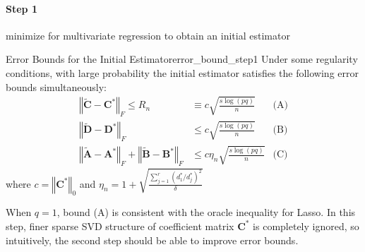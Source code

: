 \documentclass[twoside]{article}
\begin{document}
\paragraph*{Step 1} minimize  for multivariate regression to obtain an initial estimator
\begin{theorem}{Error Bounds for the Initial Estimator}{error_bound_step1}
    Under some regularity conditions, with large probability the initial estimator satisfies the following error bounds simultaneously:
    \begin{align*}
        \left\Vert \tilde{\mathbf{C}}-\mathbf{C}^* \right\Vert _F\leq R_n &\equiv c\sqrt{\frac{s \log (pq)}{n}} & \text{(A)}\\
        \left\Vert \tilde{\mathbf{D}}-\mathbf{D}^* \right\Vert _F &\leq c\sqrt{\frac{s \log (pq)}{n}} &\text{(B)}\\
        \left\Vert \tilde{\mathbf{A}}-\mathbf{A}^* \right\Vert _F + \left\Vert \tilde{\mathbf{B}}-\mathbf{B}^* \right\Vert _F &\leq c\eta_n \sqrt{\frac{s \log (pq)}{n}} & \text{(C)}
    \end{align*}
    where $c= \left\Vert \mathbf{C}^* \right\Vert _0$ and $\eta_n = 1+ \sqrt{\frac{\sum^r_{j=1}(d_1^*/d_j^*)^2}{\delta}} $
\end{theorem}
When $q=1$, bound (A) is consistent with the oracle inequality for Lasso. In this step, finer sparse SVD structure of coefficient matrix $\mathbf{C}^*$ is completely ignored, so intuitively, the second step should be able to improve error bounds.
\end{document}
